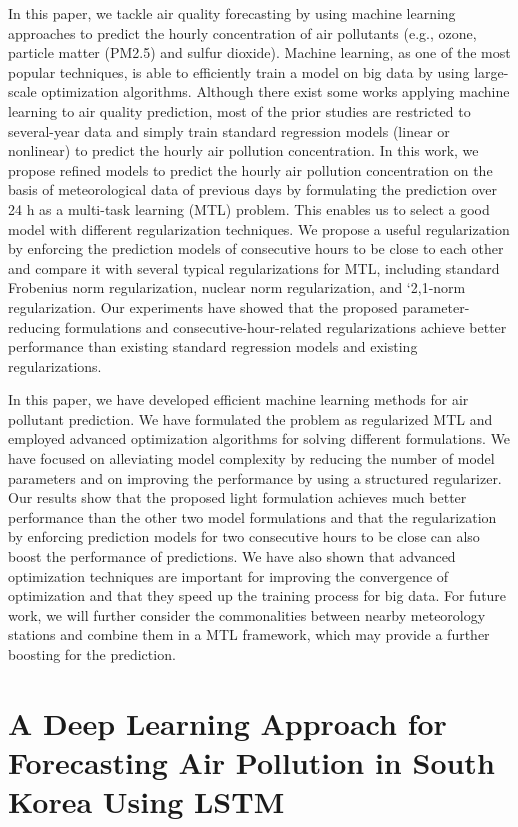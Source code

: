In this paper, we tackle air quality forecasting by using machine learning approaches
to predict the hourly concentration of air pollutants (e.g., ozone, particle matter (PM2.5) and sulfur
dioxide). Machine learning, as one of the most popular techniques, is able to efficiently train a model
on big data by using large-scale optimization algorithms. Although there exist some works applying
machine learning to air quality prediction, most of the prior studies are restricted to several-year
data and simply train standard regression models (linear or nonlinear) to predict the hourly air
pollution concentration. In this work, we propose refined models to predict the hourly air pollution
concentration on the basis of meteorological data of previous days by formulating the prediction over
24 h as a multi-task learning (MTL) problem. This enables us to select a good model with different
regularization techniques. We propose a useful regularization by enforcing the prediction models of
consecutive hours to be close to each other and compare it with several typical regularizations for
MTL, including standard Frobenius norm regularization, nuclear norm regularization, and `2,1-norm
regularization. Our experiments have showed that the proposed parameter-reducing formulations
and consecutive-hour-related regularizations achieve better performance than existing standard
regression models and existing regularizations.

In this paper, we have developed efficient machine learning methods for air pollutant prediction.
We have formulated the problem as regularized MTL and employed advanced optimization algorithms
for solving different formulations. We have focused on alleviating model complexity by reducing the
number of model parameters and on improving the performance by using a structured regularizer.
Our results show that the proposed light formulation achieves much better performance than the
other two model formulations and that the regularization by enforcing prediction models for two
consecutive hours to be close can also boost the performance of predictions. We have also shown that
advanced optimization techniques are important for improving the convergence of optimization and
that they speed up the training process for big data. For future work, we will further consider the
commonalities between nearby meteorology stations and combine them in a MTL framework, which
may provide a further boosting for the prediction.

\section{A Deep Learning Approach for Forecasting Air Pollution in South Korea Using LSTM}

